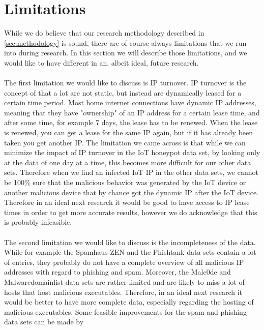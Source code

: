 \documentclass[a4paper,10pt]{article}
\begin{document}
\section{Limitations} \label{sec:limitations}
While we do believe that our research methodology described in \autoref{sec:methodology} is sound, there are of course always 
limitations that we run into during research. In this section we will describe those limitations, and we would like to have different
in an, albeit ideal, future research.
\\\\
The first limitation we would like to discuss is IP turnover. IP turnover is the concept of that a lot are not static, but instead are
dynamically leased for a certain time period. Most home internet connections have dynamic IP addresses, meaning that they have
"ownership" of an IP address for a certain lease time, and after some time, for example 7 days, the lease has to be renewed. When
the lease is renewed, you can get a lease for the same IP again, but if it has already been taken you get another IP. The limitation
we came across is that while we can minimize the impact of IP turnover in the IoT honeypot data set, by looking only at the data of
one day at a time, this becomes more difficult for our other data sets. Therefore when we find an infected IoT IP in the other data sets,
we cannot be 100\% sure that the malicious behavior was generated by the IoT device or another malicious device that by chance
got the dynamic IP after the IoT device. Therefore in an ideal next research it would be good to have access to IP lease times in order
to get more accurate results, however we do acknowledge that this is probably infeasible.
\\\\
The second limitation we would like to discuss is the incompleteness of the data. While for example the Spamhaus ZEN and the 
Phishtank data sets contain a lot of entries, they probably do not have a complete overview of all malicious IP addresses with regard
to phishing and spam. Moreover, the Malc0de and Malwaredomainlist data sets are rather limited and are likely to miss a lot of 
hosts that host malicious executables. Therefore, in an ideal next research it would be better to have more complete data, especially
regarding the hosting of malicious executables. Some feasible improvements for the spam and phishing data sets can be made by 
\end{document}
